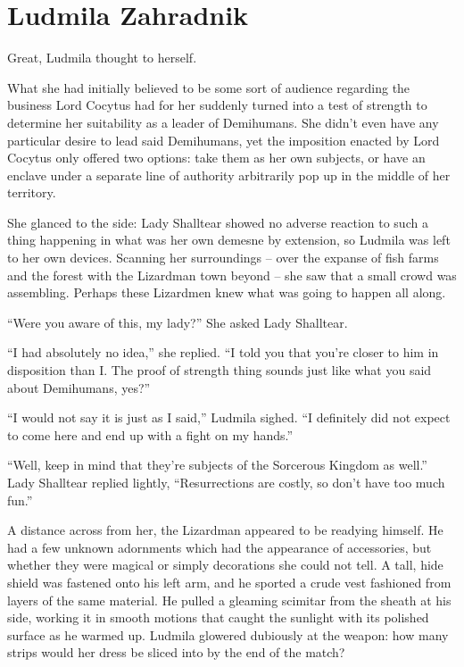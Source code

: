 \chapter{Ludmila Zahradnik}

Great, Ludmila thought to herself.

 

What she had initially believed to be some sort of audience regarding the business Lord Cocytus had for her suddenly turned into a test of strength to determine her suitability as a leader of Demihumans. She didn’t even have any particular desire to lead said Demihumans, yet the imposition enacted by Lord Cocytus only offered two options: take them as her own subjects, or have an enclave under a separate line of authority arbitrarily pop up in the middle of her territory.

 

She glanced to the side: Lady Shalltear showed no adverse reaction to such a thing happening in what was her own demesne by extension, so Ludmila was left to her own devices. Scanning her surroundings – over the expanse of fish farms and the forest with the Lizardman town beyond – she saw that a small crowd was assembling. Perhaps these Lizardmen knew what was going to happen all along.

 

“Were you aware of this, my lady?” She asked Lady Shalltear.

 

“I had absolutely no idea,” she replied. “I told you that you’re closer to him in disposition than I. The proof of strength thing sounds just like what you said about Demihumans, yes?”

 

“I would not say it is just as I said,” Ludmila sighed. “I definitely did not expect to come here and end up with a fight on my hands.”

 

“Well, keep in mind that they’re subjects of the Sorcerous Kingdom as well.” Lady Shalltear replied lightly, “Resurrections are costly, so don’t have too much fun.”

 

A distance across from her, the Lizardman appeared to be readying himself. He had a few unknown adornments which had the appearance of accessories, but whether they were magical or simply decorations she could not tell. A tall, hide shield was fastened onto his left arm, and he sported a crude vest fashioned from layers of the same material. He pulled a gleaming scimitar from the sheath at his side, working it in smooth motions that caught the sunlight with its polished surface as he warmed up. Ludmila glowered dubiously at the weapon: how many strips would her dress be sliced into by the end of the match?

